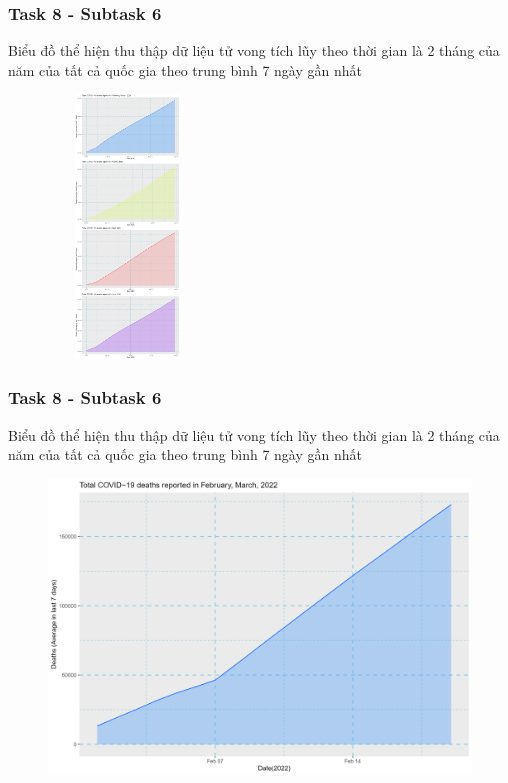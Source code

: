 \documentclass[english,10pt,table]{beamer}
\begin{document}
{
    \frametitle{Task 8 - Subtask 6}
    \begin{block}{Biểu đồ thể hiện thu thập dữ liệu tử vong tích lũy theo thời gian là 2 tháng của năm của tất cả quốc gia theo trung bình 7 ngày gần nhất}
    \begin{figure}[H]
			\centering
			\includegraphics[height=7cm,width=4.2cm]{images/8.6.2.png}
	\end{figure}
    \end{block}
}
\frame
{
    \frametitle{Task 8 - Subtask 6}
    \begin{block}{Biểu đồ thể hiện thu thập dữ liệu tử vong tích lũy theo thời gian là 2 tháng của năm của tất cả quốc gia theo trung bình 7 ngày gần nhất}
    \begin{figure}[H]
			\centering
			\includegraphics[scale=0.1]{images/8.6.3.png}
	\end{figure}
    \end{block}
}
\frame
\end{document}
